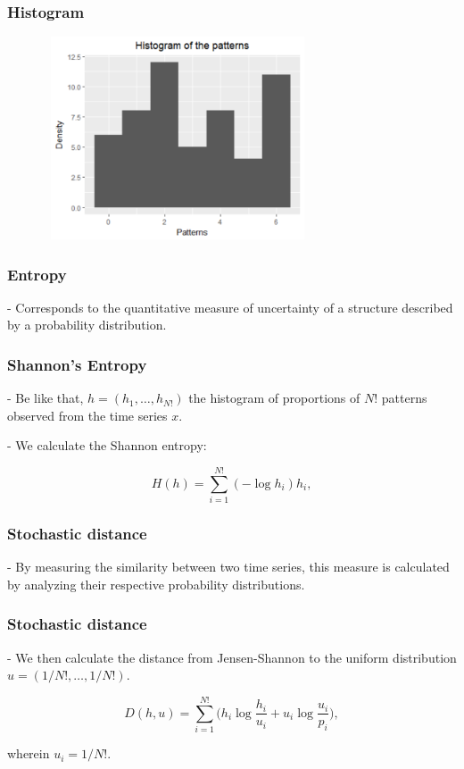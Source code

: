 \documentclass[10pt, compress]{beamer}
\begin{document}
\begin{frame}[fragile]
\frametitle{Histogram}

\begin{figure}
  \centering
   \includegraphics[width=8cm,height=6cm]{Rplot02.pdf}
\end{figure}
\end{frame}

\begin{frame}[fragile]
\frametitle{Entropy}

- Corresponds to the quantitative measure of uncertainty of a structure described by a probability distribution.

\end{frame}

\begin{frame}[fragile]
\frametitle{Shannon's Entropy}

- Be like that, $h=(h_1,\dots,h_{N!})$ the histogram of proportions of $N!$ patterns observed from the time series $x$.

- We calculate the Shannon entropy:

\begin{equation}
 H(h) = \sum_{i=1}^{N!} (-\log h_i) h_i ,
\label{eq:Entropia}
\end{equation}

\end{frame}
 
\begin{frame}[fragile]
\frametitle{Stochastic distance}

- By measuring the similarity between two time series, this measure is calculated by analyzing their respective probability distributions.

\end{frame}

\begin{frame}[fragile]
\frametitle{Stochastic distance}

- We then calculate the distance from Jensen-Shannon to the uniform distribution $ u=(1/N!,\dots,1/N!)$.

\begin{equation}
D( h, u) = \sum_{i=1}^{N!} \Big(h_i \log\frac{h_i}{u_i} +
u_i \log\frac{u_i}{p_i}
\Big),
\end{equation}

wherein $u_i=1/N!$.
\end{frame}
\end{document}
